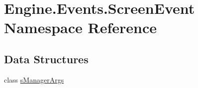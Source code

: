 \hypertarget{a00249}{}\section{Engine.\+Events.\+Screen\+Event Namespace Reference}
\label{a00249}
\subsection*{Data Structures}
\begin{DoxyCompactItemize}
\item 
class \hyperlink{a00386}{s\+Manager\+Args}
\end{DoxyCompactItemize}
